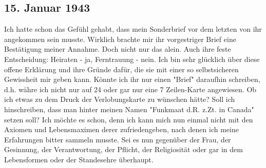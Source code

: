 \subsection{15. Januar 1943}

Ich hatte schon das Gef\"{u}hl gehabt, dass mein Sonderbrief vor dem letzten von ihr angekommen sein musste.
Wirklich brachte mir ihr vorgestriger Brief eine Best\"{a}tigung meiner Annahme.
Doch nicht nur das alein.
Auch ihre feste Entscheidung: Heiraten - ja, Ferntrauung - nein.
Ich bin sehr gl\"{u}cklich \"{u}ber diese offene Erkl\"{a}rung und ihre Gr\"{u}nde daf\"{u}r, die sie mit einer so selbstsicheren Gewissheit mir geben kann.
K\"{o}nnte ich ihr nur einen "Brief" daraufhin schreiben, d.h. w\"{a}hre ich nicht nur auf 24 oder gar nur eine 7 Zeilen-Karte angewiesen.
Ob ich etwas zu dem Druck der Verlobungskarte zu w\"{u}nschen h\"{a}tte?
Soll ich hinschreiben, dass man hinter meinen Namen "Funkmaat d.R. z.Zt. in Canada" setzen soll?
Ich m\"{o}chte es schon, denn ich kann mich nun einmal nicht mit den Axiomen und Lebensmaximen derer zufriedengeben, nach denen ich meine Erfahrungen bitter sammeln musste.
Sei es nun gegen\"{u}ber der Frau, der Gesinnung, der Verantwortung, der Pflicht, der Religiosit\"{a}t oder gar in dem Lebensformen oder der Standesehre \"{u}berhaupt.

\clearpage
